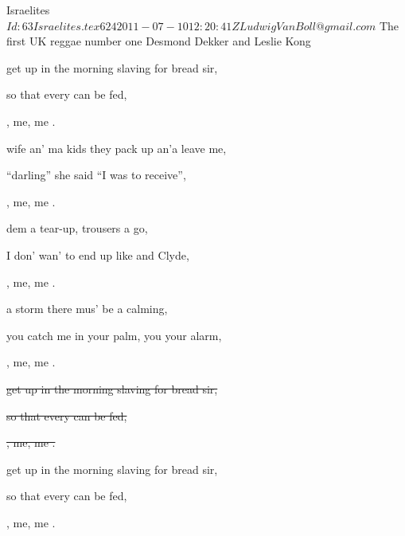 \begin{SBSong}{Israelites}
  {$Id: 63Israelites.tex 624 2011-07-10 12:20:41Z LudwigVanBoll@gmail.com $}
  {The first UK reggae number one}
  {Desmond Dekker and Leslie Kong}
  \SBDirection{}
  \begin{SBVerse}
	 get up in the morning slaving for bread sir,
	
	so that every  can be fed,
	
	,  me, me . 
  \end{SBVerse}
  \begin{SBVerse}
	 wife an' ma kids they pack up an'a leave me,
	
	``darling'' she said ``I was  to receive'',
	
	,  me, me . 
  \end{SBVerse}
  \begin{SBVerse}
	 dem a tear-up, trousers a go,
	
	I don' wan' to end up like  and Clyde,
	
	,  me, me . 
  \end{SBVerse}
  \begin{SBVerse}
	 a storm there mus' be a calming,
	
	you catch me in your palm, you  your alarm,
	
	,  me, me . 
  \end{SBVerse}
  \begin{SBVerse}

	\sout{ get up in the morning slaving for bread sir,}
	
	\sout{so that every  can be fed,}
	
	\sout{,  me, me . }
  \end{SBVerse}
  \begin{SBVerse}
	 get up in the morning slaving for bread sir,
	
	so that every  can be fed,
	
	,  me, me . 
  \end{SBVerse}
\end{SBSong}
